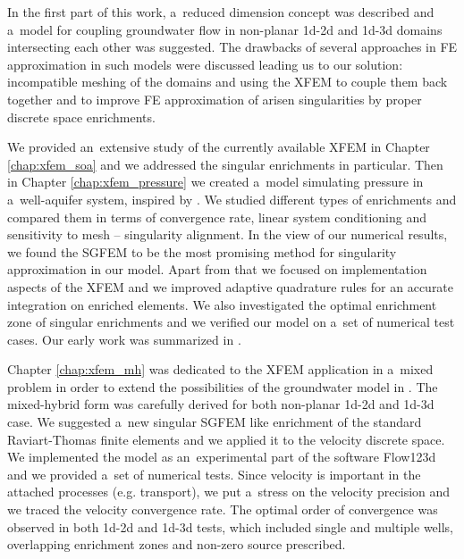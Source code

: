 \documentclass[bibliography=totocnumbered,dvipsnames,FM,Dis, EN]{tulthesis_autoreferat}
\begin{document}
In the first part of this work, a~reduced dimension concept was described and a~model for coupling
groundwater flow in non-planar 1d-2d and 1d-3d domains intersecting each other was suggested. 
The drawbacks of several approaches in FE approximation in such models were discussed leading us to
our solution: incompatible meshing of the domains and using the XFEM to couple them back together and to improve
FE approximation of arisen singularities by proper discrete space enrichments.

We provided an~extensive study of the currently available XFEM \cite{fries_xfem_overview_2010, babuska_stable_2012} in Chapter \ref{chap:xfem_soa}
and we addressed the singular enrichments in particular. 
Then in Chapter \ref{chap:xfem_pressure} we created a~model simulating pressure in a~well-aquifer system, inspired by \cite{gracie_modelling_2010, craig_using_2011}.
We studied different types of enrichments and compared them in terms of
convergence rate, linear system conditioning and sensitivity to mesh -- singularity alignment.
In the view of our numerical results, we found the SGFEM to be the most promising method
for singularity approximation in our model.
Apart from that we focused on implementation aspects of the XFEM and we improved adaptive quadrature rules
for an accurate integration on enriched elements. We also investigated the optimal enrichment zone
of singular enrichments and we verified our model on a~set of numerical test cases.
Our early work was summarized in \cite{exner_2016}.


Chapter \ref{chap:xfem_mh} was dedicated to the XFEM application in a~mixed problem
in order to extend the possibilities of the groundwater model in \cite{sistek_bddc_2015, flow123d}.
The mixed-hybrid form was carefully derived for both non-planar 1d-2d and 1d-3d case.
We suggested a~new singular SGFEM like enrichment of the standard Raviart-Thomas finite elements
and we applied it to the velocity discrete space.
We implemented the model as an~experimental part of the software Flow123d
and we provided a~set of numerical tests.
Since velocity is important in the attached processes (e.g. transport),
we put a~stress on the velocity precision and we traced the velocity convergence rate.
The optimal order of convergence was observed in both 1d-2d and 1d-3d tests,
which included single and multiple wells, overlapping enrichment zones and non-zero source prescribed.
\end{document}
